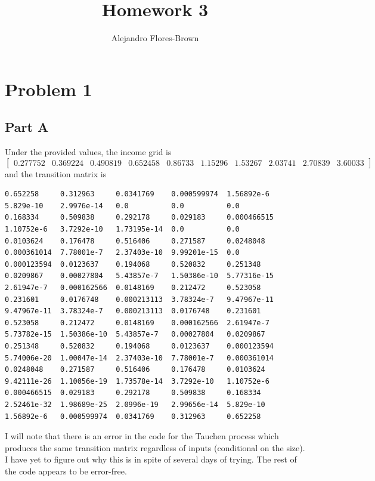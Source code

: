 \documentclass[12pt, letterpaper, parskip = full]{article}
\title{Homework 3}
\author{Alejandro Flores-Brown}
\begin{document}
  \maketitle

  \section{Problem 1}

  \subsection{Part A}

  Under the provided values, the income grid is
  \[   \begin{bmatrix}  0.277752 & 0.369224 & 0.490819 & 0.652458 & 0.86733  & 1.15296 & 1.53267 & 2.03741 & 2.70839 & 3.60033 \end{bmatrix}
 \]
 and the transition matrix is
 \tiny
 \begin{verbatim}
0.652258     0.312963     0.0341769    0.000599974  1.56892e-6   5.829e-10    2.9976e-14   0.0          0.0          0.0
0.168334     0.509838     0.292178     0.029183     0.000466515  1.10752e-6   3.7292e-10   1.73195e-14  0.0          0.0
0.0103624    0.176478     0.516406     0.271587     0.0248048    0.000361014  7.78001e-7   2.37403e-10  9.99201e-15  0.0
0.000123594  0.0123637    0.194068     0.520832     0.251348     0.0209867    0.00027804   5.43857e-7   1.50386e-10  5.77316e-15
2.61947e-7   0.000162566  0.0148169    0.212472     0.523058     0.231601     0.0176748    0.000213113  3.78324e-7   9.47967e-11
9.47967e-11  3.78324e-7   0.000213113  0.0176748    0.231601     0.523058     0.212472     0.0148169    0.000162566  2.61947e-7
5.73782e-15  1.50386e-10  5.43857e-7   0.00027804   0.0209867    0.251348     0.520832     0.194068     0.0123637    0.000123594
5.74006e-20  1.00047e-14  2.37403e-10  7.78001e-7   0.000361014  0.0248048    0.271587     0.516406     0.176478     0.0103624
9.42111e-26  1.10056e-19  1.73578e-14  3.7292e-10   1.10752e-6   0.000466515  0.029183     0.292178     0.509838     0.168334
2.52461e-32  1.98689e-25  2.0996e-19   2.99656e-14  5.829e-10    1.56892e-6   0.000599974  0.0341769    0.312963     0.652258
 \end{verbatim}
\normalsize
 I will note that there is an error in the code for the Tauchen process which produces the same transition matrix regardless of inputs (conditional on the size). I have yet to figure out why this is in spite of several days of trying. The rest of the code appears to be error-free.
\end{document}
